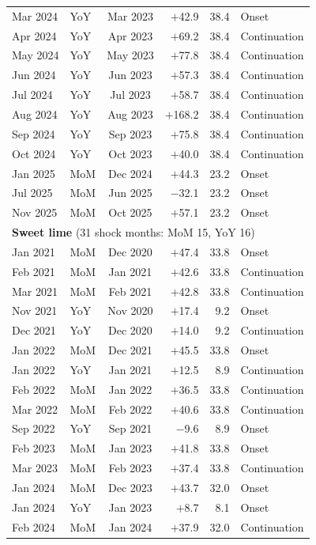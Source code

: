 \begin{longtable}{llcrrl}
Mar 2024 & YoY & Mar 2023 & $+$42.9 & 38.4 & Onset \\
Apr 2024 & YoY & Apr 2023 & $+$69.2 & 38.4 & Continuation \\
May 2024 & YoY & May 2023 & $+$77.8 & 38.4 & Continuation \\
Jun 2024 & YoY & Jun 2023 & $+$57.3 & 38.4 & Continuation \\
Jul 2024 & YoY & Jul 2023 & $+$58.7 & 38.4 & Continuation \\
Aug 2024 & YoY & Aug 2023 & $+$168.2 & 38.4 & Continuation \\
Sep 2024 & YoY & Sep 2023 & $+$75.8 & 38.4 & Continuation \\
Oct 2024 & YoY & Oct 2023 & $+$40.0 & 38.4 & Continuation \\
Jan 2025 & MoM & Dec 2024 & $+$44.3 & 23.2 & Onset \\
Jul 2025 & MoM & Jun 2025 & $-$32.1 & 23.2 & Onset \\
Nov 2025 & MoM & Oct 2025 & $+$57.1 & 23.2 & Onset \\
\midrule
\multicolumn{6}{l}{\textbf{Sweet lime} (31 shock months: MoM 15, YoY 16)}\\
\midrule
Jan 2021 & MoM & Dec 2020 & $+$47.4 & 33.8 & Onset \\
Feb 2021 & MoM & Jan 2021 & $+$42.6 & 33.8 & Continuation \\
Mar 2021 & MoM & Feb 2021 & $+$42.8 & 33.8 & Continuation \\
Nov 2021 & YoY & Nov 2020 & $+$17.4 & 9.2 & Onset \\
Dec 2021 & YoY & Dec 2020 & $+$14.0 & 9.2 & Continuation \\
Jan 2022 & MoM & Dec 2021 & $+$45.5 & 33.8 & Onset \\
Jan 2022 & YoY & Jan 2021 & $+$12.5 & 8.9 & Continuation \\
Feb 2022 & MoM & Jan 2022 & $+$36.5 & 33.8 & Continuation \\
Mar 2022 & MoM & Feb 2022 & $+$40.6 & 33.8 & Continuation \\
Sep 2022 & YoY & Sep 2021 & $-$9.6 & 8.9 & Onset \\
Feb 2023 & MoM & Jan 2023 & $+$41.8 & 33.8 & Onset \\
Mar 2023 & MoM & Feb 2023 & $+$37.4 & 33.8 & Continuation \\
Jan 2024 & MoM & Dec 2023 & $+$43.7 & 32.0 & Onset \\
Jan 2024 & YoY & Jan 2023 & $+$8.7 & 8.1 & Onset \\
Feb 2024 & MoM & Jan 2024 & $+$37.9 & 32.0 & Continuation \\

\end{longtable}

